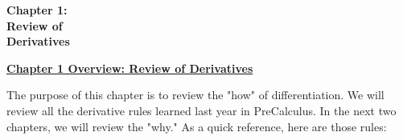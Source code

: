 \documentclass[11pt]{exam}
\begin{document}
\pagestyle{plain}
\allowdisplaybreaks

\vspace*{2.5cm}
\begin{center}
    {\fontsize{48}{48}\selectfont \textbf{Chapter 1:}} \\
    \vspace{72pt}
    {\fontsize{48}{48}\selectfont \textbf{Review of}} \\
    \vspace{24pt}
    {\fontsize{48}{48}\selectfont \textbf{Derivatives}}
\end{center}

\newpage
\setcounter{page}{1}

\textbf{\underline{\large{Chapter 1 Overview: Review of Derivatives}}} \par

The purpose of this chapter is to review the "how" of differentiation. We will review all the derivative rules learned last year in PreCalculus. In the next two chapters, we will review the "why." As a quick reference, here are those rules: 
\end{document}
